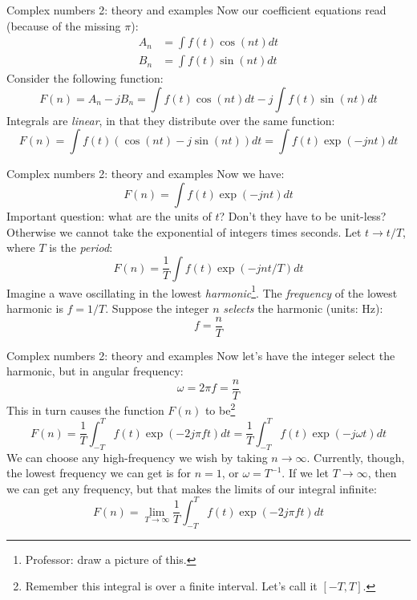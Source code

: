 \documentclass{beamer}
\begin{document}
\begin{frame}[fragile]{Complex numbers 2: theory and examples}
\small
Now our coefficient equations read (because of the missing $\pi$):
\begin{align}
A_n &= \int f(t) \cos(nt) dt \\
B_n &= \int f(t) \sin(nt) dt
\end{align}
Consider the following function:
\begin{equation}
F(n) = A_n - j B_n = \int f(t) \cos(nt) dt - j \int f(t) \sin(nt) dt
\end{equation}
Integrals are \textit{linear}, in that they distribute over the same function:
\begin{equation}
F(n) = \int f(t) (\cos(nt) - j \sin(nt)) dt = \int f(t) \exp(-jnt) dt
\end{equation}
\end{frame}

\begin{frame}[fragile]{Complex numbers 2: theory and examples}
\small
Now we have:
\begin{equation}
F(n) = \int f(t) \exp(-jnt) dt
\end{equation}
\alert{Important question}: what are the units of $t$?  Don't they have to be unit-less?  Otherwise we cannot take the exponential of integers times seconds.  Let $t \rightarrow t/T$, where $T$ is the \textit{period}:
\begin{equation}
F(n) = \frac{1}{T}\int f(t) \exp(-jnt/T) dt
\end{equation}
Imagine a wave oscillating in the lowest \textit{harmonic}\footnote{Professor: draw a picture of this.}. The \textit{frequency} of the lowest harmonic is $f = 1/T$.  Suppose the integer $n$ \textit{selects} the harmonic (units: Hz):
\begin{equation}
f = \frac{n}{T}
\end{equation}
\end{frame}

\begin{frame}[fragile]{Complex numbers 2: theory and examples}
\small
Now let's have the integer select the harmonic, but in angular frequency:
\begin{equation}
\omega = 2\pi f = \frac{n}{T}
\end{equation}
This in turn causes the function $F(n)$ to be\footnote{Remember this integral is over a finite interval.  Let's call it $[-T,T]$.}
\begin{equation}
F(n) = \frac{1}{T}\int_{-T}^{T} f(t) \exp(-2j\pi f t) dt = \frac{1}{T}\int_{-T}^{T} f(t) \exp(-j\omega t) dt
\end{equation}
We can choose any high-frequency we wish by taking $n \rightarrow \infty$.  Currently, though, the lowest frequency we can get is for $n=1$, or $\omega = T^{-1}$.  If we let $T \rightarrow \infty$, then we can get any frequency, but that makes the limits of our integral infinite:
\begin{equation}
F(n) = \lim_{T\rightarrow \infty} \frac{1}{T}\int_{-T}^{T} f(t) \exp(-2j\pi f t) dt
\end{equation}
\end{frame}
\end{document}

